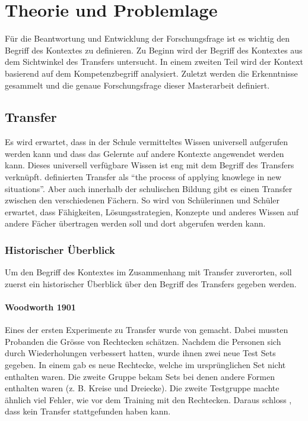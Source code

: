 \chapter{Theorie und Problemlage}

Für die Beantwortung und Entwicklung der Forschungsfrage ist es wichtig den Begriff des Kontextes zu definieren. Zu Beginn wird der Begriff des Kontextes aus dem Sichtwinkel des Transfers untersucht. In einem zweiten Teil wird der Kontext basierend auf dem Kompetenzbegriff analysiert. Zuletzt werden die Erkenntnisse gesammelt und die genaue Forschungsfrage dieser Masterarbeit definiert.

\section{Transfer}

Es wird erwartet, dass in der Schule vermitteltes Wissen universell aufgerufen werden kann und dass das Gelernte auf andere Kontexte angewendet werden kann. Dieses universell verfügbare Wissen ist eng mit dem Begriff des Transfers verknüpft. \citet{Greeno1996} definierten Transfer als "`the process of applying knowlege in new situations"'. Aber auch innerhalb der schulischen Bildung gibt es einen Transfer zwischen den verschiedenen Fächern. So wird von Schülerinnen und Schüler erwartet, dass Fähigkeiten, Lösungsstrategien, Konzepte und anderes Wissen auf andere Fächer übertragen werden soll und dort abgerufen werden kann.

\subsection{Historischer Überblick}

Um den Begriff des Kontextes im Zusammenhang mit Transfer zuverorten, soll zuerst ein historischer Überblick über den Begriff des Transfers gegeben werden.


\subsubsection{Woodworth 1901}

Eines der ersten Experimente zu Transfer wurde von \citet{Woodworth1901} gemacht. Dabei mussten Probanden die Grösse von Rechtecken schätzen. Nachdem die Personen sich durch Wiederholungen verbessert hatten, wurde ihnen zwei neue Test Sets gegeben. In einem gab es neue Rechtecke, welche im ursprünglichen Set nicht enthalten waren. Die zweite Gruppe bekam Sets bei denen andere Formen enthalten waren (z. B. Kreise und Dreiecke). Die zweite Testgruppe machte ähnlich viel Fehler, wie vor dem Training mit den Rechtecken. Daraus schloss \citeauthor{Woodworth1901}, dass kein Transfer stattgefunden haben kann.

